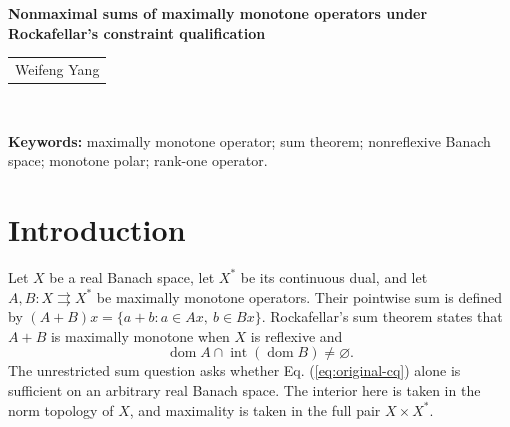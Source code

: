 \documentclass[11pt]{article}
\newcommand{\dom}{\operatorname{dom}}
\theoremstyle{definition}
\theoremstyle{remark}
\begin{document}
\begin{center}
{\Large\bfseries Nonmaximal sums of maximally monotone operators under Rockafellar’s constraint qualification}\\[10pt]
\begin{tabular}{c}
Weifeng Yang\footnotemark
\end{tabular}\\[10pt]
\end{center}


\begin{abstract}


We construct counterexamples to Rockafellar's sum conjecture in which two maximally monotone operators satisfy the interior-domain condition but their sum is not maximally monotone. We give one counterexample on $c_0$ and another on $\ell^1$ with its usual norm.
We establish a general construction theorem that computes the entire monotone polar of a class of graphs, gives a necessary and sufficient condition for their maximal monotonicity, and shows how a positive rank-one perturbation produces a nonmaximal sum under this condition. By coupling triangular operators with a Lipschitz curve, we verify the theorem's hypotheses and its maximality criterion on $c_0$, thereby obtaining a counterexample to the conjecture. We then construct a bounded linear surjection from $\ell^1$ onto $c_0$ and use it to obtain the counterexample on $\ell^1$.





\end{abstract}


\noindent\textbf{Keywords:} maximally monotone operator; sum theorem;
nonreflexive Banach space; monotone polar; rank-one operator.

\section{Introduction}
\label{sec:introduction}
Let $X$ be a real Banach space, let $X^*$ be its continuous dual, and let $A,B:X\rightrightarrows X^*$ be maximally monotone operators. Their pointwise sum is defined by $(A+B)x=\{a+b:a\in Ax,\ b\in Bx\}$. Rockafellar's sum theorem \cite{rockafellar1970} states that $A+B$ is maximally monotone when $X$ is reflexive and
\begin{equation}
\dom A\cap\operatorname{int}(\dom B)\ne\varnothing.
\label{eq:original-cq}
\end{equation}
The unrestricted sum question asks whether Eq. (\ref{eq:original-cq}) alone is sufficient on an arbitrary real Banach space. The interior here is taken in the norm topology of $X$, and maximality is taken in the full pair $X\times X^*$.
\end{document}
